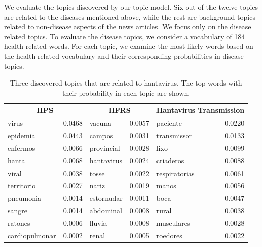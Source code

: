 \documentclass[twoside,leqno,twocolumn]{article}
\begin{document}
We evaluate the topics discovered by our topic model. Six out of the twelve topics are related to the diseases mentioned above, while the rest are background topics related to non-disease aspects of the news articles. We focus only on the disease related topics. To evaluate the disease topics, we consider a vocabulary of 184 health-related words. For each topic, we examine the most likely words based on the health-related vocabulary and their corresponding probabilities in disease topics.
\begin{table}[t]
\scriptsize \centering
\captionsetup{font=scriptsize}
\caption{Three discovered topics that are related to hantavirus. The top words with their probability in each topic are shown.}
\begin{tabular}{|lr|lr|lr|}
\hline
\multicolumn{2}{|c|}{\bf HPS} & \multicolumn{2}{|c|}{\bf HFRS} &
\multicolumn{2}{|c|}{\bf Hantavirus Transmission} \\ \hline
virus & 0.0468 & vacuna & 0.0057 & paciente & 0.0220 \\
epidemia & 0.0443 & campos & 0.0031 & transmissor & 0.0133 \\
enfermos & 0.0066& provincial & 0.0028  & lixo &0.0099 \\
hanta & 0.0068 & hantavirus & 0.0024  & criaderos & 0.0088\\
viral & 0.0038 & tosse & 0.0022 & respiratorias & 0.0061 \\
territorio & 0.0027 & nariz & 0.0019 & manos & 0.0056 \\
pneumonia & 0.0014 & estornudar & 0.0011 & boca & 0.0047 \\
sangre & 0.0014 & abdominal & 0.0008 & rural & 0.0038 \\
ratones & 0.0006 & lluvia & 0.0008 & musculares & 0.0028 \\
cardiopulmonar & 0.0002 & renal & 0.0005 & roedores & 0.0022 \\
\hline
\end{tabular}
\label{tab:hanta_topics}
\vspace{-10pt}
\end{table}
\end{document}
